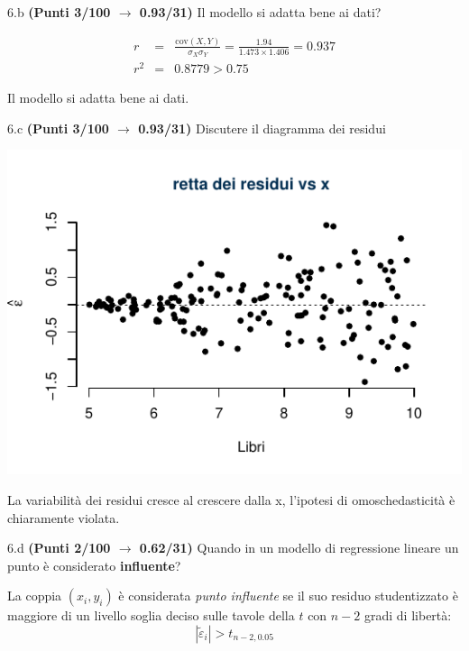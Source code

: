 \documentclass[
  11pt,
]{book}
\theoremstyle{mytheoremstyle}
\theoremstyle{mydefstyle}
\newenvironment{sol}
  {
  \begin{tcolorbox}[enhanced,breakable,arc=0.1mm,boxrule=1pt,colback=white,colframe=iblue,
  title=\bf \fontfamily{lmss}\selectfont \hspace{.5 cm} Soluzione,drop fuzzy shadow]

}{
\end{tcolorbox}
  }
\begin{document}
6.b \textbf{(Punti 3/100 \(\rightarrow\) 0.93/31)} Il modello si adatta bene ai dati?

\begin{sol}
\begin{eqnarray*}
r&=&\frac{\text{cov}(X,Y)}{\sigma_X\sigma_Y}=\frac{ 1.94 }{ 1.473 \times 1.406 }= 0.937 \\ 
r^2&=& 0.8779 > 0.75
\end{eqnarray*}

Il modello si adatta bene ai dati.

\end{sol}

6.c \textbf{(Punti 3/100 \(\rightarrow\) 0.93/31)} Discutere il diagramma dei residui

\begin{center}\includegraphics{Esami_passati_con_soluzioni_files/figure-latex/2021-53-1} \end{center}

\begin{sol}
La variabilità dei residui cresce al crescere dalla x, l'ipotesi di omoschedasticità è chiaramente violata.

\end{sol}

6.d \textbf{(Punti 2/100 \(\rightarrow\) 0.62/31)} Quando in un modello di regressione lineare un punto è considerato \textbf{influente}?

\begin{sol}
La coppia \((x_i,y_i)\) è considerata \emph{punto influente} se il suo residuo studentizzato è maggiore di un livello soglia deciso sulle tavole della \(t\) con \(n-2\) gradi di libertà:
\[|\tilde \varepsilon_i|>t_{n-2,0.05} \]

\end{sol}
\end{document}
